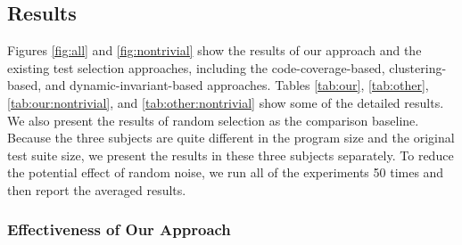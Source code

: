 \documentclass{sig-alternate}
\begin{document}
\subsection{Results}

Figures \ref{fig:all} and \ref{fig:nontrivial} show the results of
our approach and the existing test selection approaches, including
the code-coverage-based, clustering-based, and
dynamic-invariant-based approaches. Tables \ref{tab:our},
\ref{tab:other}, \ref{tab:our:nontrivial}, and
\ref{tab:other:nontrivial} show some of the detailed results. We
also present the results of random selection as the comparison
baseline. Because the three subjects are quite different in the
program size and the original test suite size, we present the
results in these three subjects separately. To reduce the potential
effect of random noise, we run all of the experiments 50 times and
then report the averaged results.

\vspace{-0.1in}

\subsubsection{Effectiveness of Our Approach}
\end{document}

